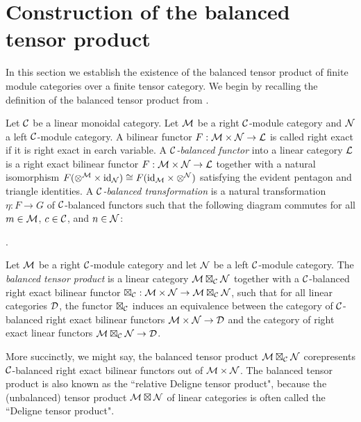 \documentclass{amsart}
\begin{document}
\section{Construction of the balanced tensor product} \label{sec:tc-deligne}

In this section we establish the existence of the balanced tensor product of finite module categories over a finite tensor category.  We begin by recalling the definition of the balanced tensor product from \cite{0909.3140}.

\begin{definition} 
	Let $\mathcal C$ be a linear monoidal category. 
	Let $\mathcal M$ be a right $\mathcal C$-module category and $\mathcal N$ a left $\mathcal C$-module category.  A bilinear functor $F: \mathcal M \times \mathcal N \to \mathcal L$ is called right exact if it is right exact in earch variable.   A {\em $\mathcal C$-balanced functor} into a linear category $\mathcal L$ is a right exact bilinear functor $F: \mathcal M \times \mathcal N \to \mathcal L$ together with a natural isomorphism $F(\otimes^{\mathcal M} \times \mathrm{id}_{\mathcal N}) \cong F(\mathrm{id}_{\mathcal M} \times \otimes^{\mathcal N})$ satisfying the evident pentagon and triangle identities.
	A {\em $\mathcal C$-balanced transformation} is a natural transformation $\eta:F \to G$ of $\mathcal C$-balanced functors such that the following diagram commutes for all $m \in \mathcal M$, $c \in \mathcal C$, and $n \in \mathcal N$:
\begin{center}
.
\end{center}
\end{definition}

\begin{definition}
	Let $\mathcal M$ be a right $\mathcal C$-module category and let $\mathcal N$ be a left $\mathcal C$-module category. The {\em balanced tensor product} is a linear category $\mathcal M \boxtimes_{\mathcal C} \mathcal N$
	 together with a $\mathcal C$-balanced right exact bilinear functor $\boxtimes_{\mathcal C} : \mathcal M \times \mathcal N \to \mathcal M \boxtimes_{\mathcal C} \mathcal N$, such that for all linear categories $\mathcal D$, the functor $\boxtimes_{\mathcal C}$ induces an equivalence between the category of $\mathcal C$-balanced right exact bilinear functors $\mathcal M \times \mathcal N \to \mathcal D$ and the category of right exact linear functors $\mathcal M \boxtimes_{\mathcal C} \mathcal N \to \mathcal D$.
\end{definition}
\nid More succinctly, we might say, the balanced tensor product $\mathcal M \boxtimes_{\mathcal C} \mathcal N$ corepresents $\mathcal C$-balanced right exact bilinear functors out of $\mathcal M \times \mathcal N$.  The balanced tensor product is also known as the ``relative Deligne tensor product", because the (unbalanced) tensor product $\mathcal M \boxtimes \mathcal N$ of linear categories is often called the ``Deligne tensor product".  
\end{document}
